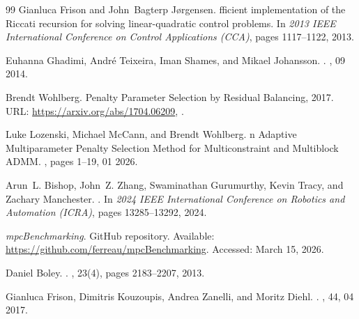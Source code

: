 \documentclass[letterpaper, 10 pt, conference]{ieeeconf}  %
\begin{document}
\begin{thebibliography}{99}
Gianluca Frison and John~Bagterp Jørgensen.
fficient implementation of the {R}iccati recursion for solving
  linear-quadratic control problems.
\newblock In {\em 2013 IEEE International Conference on Control Applications
  (CCA)}, pages 1117--1122, 2013.

Euhanna Ghadimi, André Teixeira, Iman Shames, and Mikael Johansson.
.
, 09 2014.

Brendt Wohlberg.
 {P}enalty {P}arameter {S}election by {R}esidual {B}alancing,
  2017.
\newblock URL: \url{https://arxiv.org/abs/1704.06209}, 
  {}.

Luke Lozenski, Michael McCann, and Brendt Wohlberg.
n {A}daptive {M}ultiparameter {P}enalty {S}election {M}ethod for
  {M}ulticonstraint and {M}ultiblock {ADMM}.
, pages 1--19, 01 2026.

Arun~L. Bishop, John~Z. Zhang, Swaminathan Gurumurthy, Kevin Tracy, and Zachary
  Manchester.
.
\newblock In {\em 2024 IEEE International Conference on Robotics and Automation
  (ICRA)}, pages 13285--13292, 2024.

  \newblock \textit{mpcBenchmarking}.
  \newblock GitHub repository.
  \newblock Available: \url{https://github.com/ferreau/mpcBenchmarking}.
  \newblock Accessed: March 15, 2026.

Daniel Boley.
.
, 23(4), pages 2183--2207, 2013.

Gianluca Frison, Dimitris Kouzoupis, Andrea Zanelli, and Moritz Diehl.
.
, 44, 04 2017.

\end{thebibliography}
\end{document}
